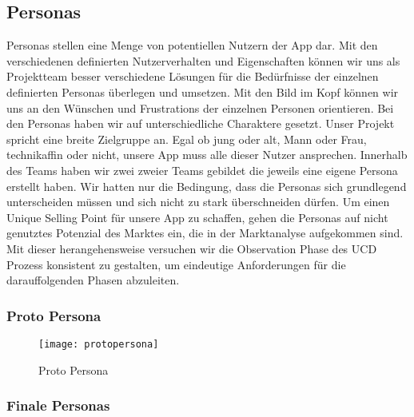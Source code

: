 \subsection{Personas}

Personas stellen eine Menge von potentiellen Nutzern der App dar. Mit den verschiedenen definierten Nutzerverhalten und Eigenschaften können wir uns als Projektteam besser verschiedene Lösungen für die Bedürfnisse der einzelnen definierten Personas überlegen und umsetzen. Mit den Bild im Kopf können wir uns an den Wünschen und Frustrations der einzelnen Personen orientieren. Bei den Personas haben wir auf unterschiedliche Charaktere gesetzt. Unser Projekt spricht eine breite Zielgruppe an. Egal ob jung oder alt, Mann oder Frau, technikaffin oder nicht, unsere App muss alle dieser Nutzer ansprechen. Innerhalb des Teams haben wir zwei zweier Teams gebildet die jeweils eine eigene Persona erstellt haben. Wir hatten nur die Bedingung, dass die Personas sich grundlegend unterscheiden müssen und sich nicht zu stark überschneiden dürfen. Um einen Unique Selling Point für unsere App zu schaffen, gehen die Personas auf nicht genutztes Potenzial des Marktes ein, die in der Marktanalyse aufgekommen sind. Mit dieser herangehensweise versuchen wir die Observation Phase des UCD Prozess konsistent zu gestalten, um eindeutige Anforderungen für die darauffolgenden Phasen abzuleiten.

\clearpage

\subsubsection{Proto Persona}

\begin{figure}[h]
  \centering
  \texttt{[image: protopersona]}
  \caption{Proto Persona}
  \label{fig:protopersona}
\end{figure}

\subsubsection{Finale Personas}
